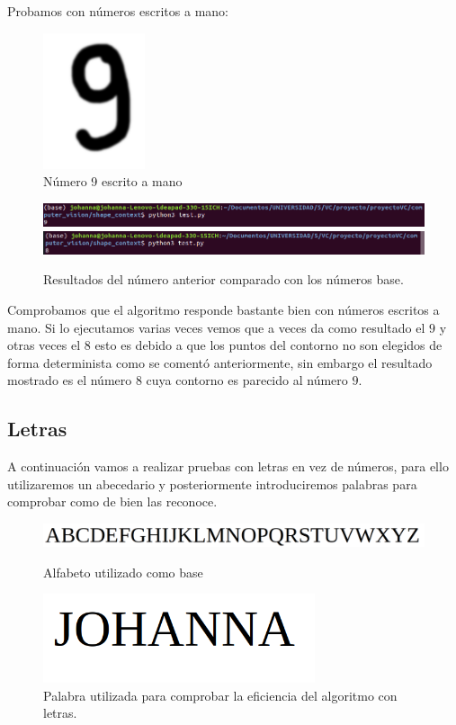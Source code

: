 \documentclass[size=a4, parskip=half, titlepage=false, toc=flat, toc=bib, 12pt]{scrartcl}
\begin{document}
Probamos con números escritos a mano:
\begin{figure}[H]
\centering
\includegraphics[width=3cm]{./img/9}
\caption{Número 9 escrito a mano}
\end{figure}
\begin{figure}[H]
\centering
\includegraphics[width=15cm]{./img/res9}
\includegraphics[width=15cm]{./img/res98}
\caption{Resultados del número anterior comparado con los números base.}
\end{figure}

Comprobamos que el algoritmo responde bastante bien con números escritos a mano. Si lo ejecutamos varias veces vemos que a veces da como resultado el $9$ y otras veces el $8$ esto es debido a que los puntos del contorno no son elegidos de forma determinista como se comentó anteriormente, sin embargo el resultado mostrado es el número $8$ cuya contorno es parecido al número $9$.

\subsection{Letras}%
\label{sub:letras}

A continuación vamos a realizar pruebas con letras en vez de números, para ello utilizaremos un abecedario y posteriormente introduciremos palabras para comprobar como de bien las reconoce.

\begin{figure}[H]
\centering
\includegraphics[width=15cm]{./img/ABC}
\caption{Alfabeto utilizado como base}
\includegraphics[width=8cm]{./img/JOHANNA}
\caption{Palabra utilizada para comprobar la eficiencia del algoritmo con letras.}
\end{figure}
\end{document}
